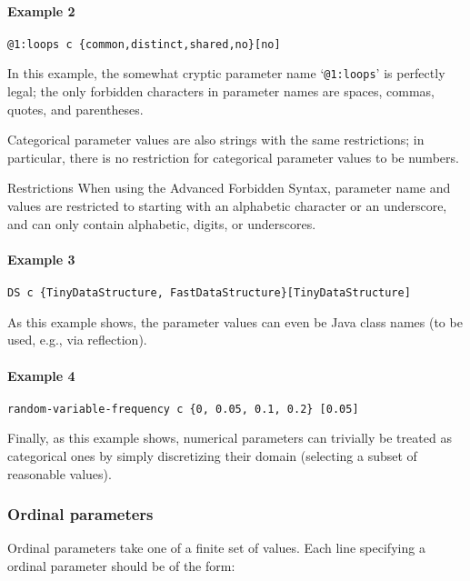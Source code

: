 \documentclass[manual.tex]{subfiles}
\begin{document}
\paragraph{Example 2}
\begin{verbatim}
@1:loops c {common,distinct,shared,no}[no]
\end{verbatim}
In this example, the somewhat cryptic parameter name `\texttt{@1:loops}' is perfectly legal; the only forbidden characters in parameter names are spaces, commas, quotes, and parentheses. 

%
Categorical parameter values are also strings with the same restrictions; in particular, there is no restriction for categorical parameter values to be numbers. 

\begin{bclogo}[logo=\bcattention, couleurBarre=red, noborder=true]{Restrictions}
When using the Advanced Forbidden Syntax, parameter name and values are restricted to starting with an alphabetic character or an underscore, and can only contain alphabetic, digits, or underscores.
\end{bclogo}

\paragraph{Example 3}
\begin{verbatim}
DS c {TinyDataStructure, FastDataStructure}[TinyDataStructure]
\end{verbatim}
As this example shows, the parameter values can even be Java class names (to be used, e.g., via reflection).

\paragraph{Example 4}
\begin{verbatim}
random-variable-frequency c {0, 0.05, 0.1, 0.2} [0.05]
\end{verbatim}
Finally, as this example shows, numerical parameters can trivially be treated as categorical ones by simply discretizing their domain (selecting a subset of reasonable values).

\subsubsection*{Ordinal parameters} \label{sec:ordinal-params}
Ordinal parameters take one of a finite set of values. Each line specifying a ordinal parameter should be of the form:
\end{document}
